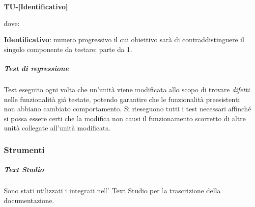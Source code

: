                             \begin{center}
                            \textbf{TU-[Identificativo]}
                            \end{center}
                            dove:

                            \textbf{Identificativo}: numero progressivo il cui obiettivo sarà di contraddistinguere il singolo componente da testare; parte da 1.

                    \subparagraph*{Test di regressione}
        				Test eseguito ogni volta che un'unità viene modificata allo scopo di trovare \textit{difetti} nelle funzionalità già testate, potendo garantire che le funzionalità preesistenti non abbiano cambiato comportamento. Si rieseguono tutti i test necessari affinché si possa essere certi che la modifica non causi il funzionamento scorretto di altre unità collegate all'unità modificata.

                \subsubsection{Strumenti}
                    \subparagraph{Text Studio}
            	        Sono stati utilizzati i  integrati nell' Text Studio per la trascrizione della documentazione.